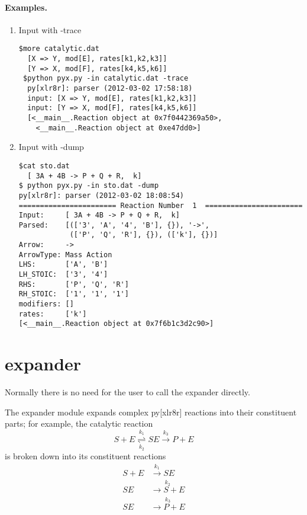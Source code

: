 \paragraph{Examples.\\}

\begin{enumerate}
\item Input with {-trace}
\begin{small}
\begin{Verbatim}[frame=single]
 $more catalytic.dat
  [X => Y, mod[E], rates[k1,k2,k3]]
  [Y => X, mod[F], rates[k4,k5,k6]]
 $python pyx.py -in catalytic.dat -trace
  py[xlr8r]: parser (2012-03-02 17:58:18)
  input: [X => Y, mod[E], rates[k1,k2,k3]]
  input: [Y => X, mod[F], rates[k4,k5,k6]]
  [<__main__.Reaction object at 0x7f0442369a50>, 
    <__main__.Reaction object at 0xe47dd0>]
\end{Verbatim}
\end{small}

\item Input with {-dump}
\begin{small}
\begin{Verbatim}[frame=single]
$cat sto.dat
  [ 3A + 4B -> P + Q + R,  k]
$ python pyx.py -in sto.dat -dump
py[xlr8r]: parser (2012-03-02 18:08:54)
======================= Reaction Number  1  =======================
Input:     [ 3A + 4B -> P + Q + R,  k]
Parsed:    [(['3', 'A', '4', 'B'], {}), '->', 
            (['P', 'Q', 'R'], {}), (['k'], {})]
Arrow:     ->
ArrowType: Mass Action
LHS:       ['A', 'B']
LH_STOIC:  ['3', '4']
RHS:       ['P', 'Q', 'R']
RH_STOIC:  ['1', '1', '1']
modifiers: []
rates:     ['k']
[<__main__.Reaction object at 0x7f6b1c3d2c90>]
\end{Verbatim}
\end{small}




\end{enumerate}



\newpage

\section{expander}

Normally there is no need for the user to call the expander directly. 

The expander module expands complex py[xlr8r] reactions into their constituent parts; for example, the catalytic reaction 
$$ S + E \underset{k_2}{\overset {k_1}{\rightleftharpoons}} SE \overset{k_3}{\to} P+E $$
is broken down into its constituent reactions
\begin{align*}
S+E &\overset{k_1}{\to} SE\\
SE &\overset{k_2}{\to S+E}\\
SE &\overset{k_3}{\to P+E}
\end{align*}

